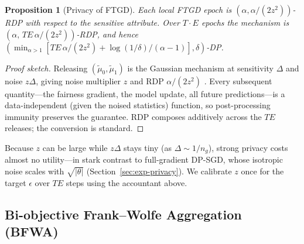 \documentclass[pdflatex,sn-mathphys-num]{sn-jnl}
\theoremstyle{thmstyleone}%
\newtheorem{proposition}[theorem]{Proposition}%
\theoremstyle{thmstyletwo}%
\theoremstyle{thmstylethree}%
\begin{document}
\begin{proposition}[Privacy of FTGD]
Each local FTGD epoch is $(\alpha,\alpha/(2z^2))$-RDP with respect to the
sensitive attribute. Over $T\!\cdot\!E$ epochs the mechanism is
$(\alpha,\,TE\,\alpha/(2z^2))$-RDP, and hence
$(\min_{\alpha>1}[TE\,\alpha/(2z^2)+\log(1/\delta)/(\alpha-1)],\delta)$-DP.
\end{proposition}
\begin{proof}[Proof sketch]
Releasing $(\tilde{\mu}_0,\tilde{\mu}_1)$ is the Gaussian mechanism at
sensitivity $\Delta$ and noise $z\Delta$, giving noise multiplier $z$ and RDP
$\alpha/(2z^2)$ \cite{mironov2017renyi}. Every subsequent quantity---the
fairness gradient, the model update, all future predictions---is a
data-independent (given the noised statistics) function, so post-processing
immunity preserves the guarantee. RDP composes additively across the $TE$
releases; the conversion is standard.
\end{proof}

Because $z$ can be large while $z\Delta$ stays tiny (as $\Delta\!\sim\!1/n_g$),
strong privacy costs almost no utility---in stark contrast to full-gradient
DP-SGD, whose isotropic noise scales with $\sqrt{|\theta|}$
(Section~\ref{sec:exp-privacy}). We calibrate $z$ once for the target
$\epsilon$ over $TE$ steps using the accountant above.

\subsection{Bi-objective Frank--Wolfe Aggregation (BFWA)}
\label{sec:bfwa}
\end{document}
